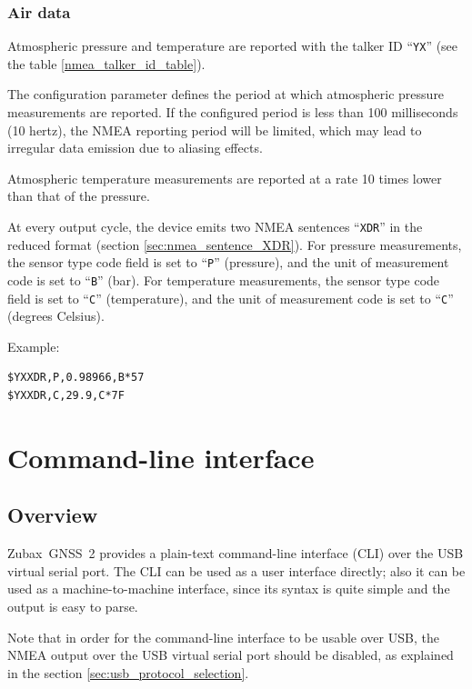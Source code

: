 \documentclass{zubaxdoc}
\begin{document}
\subsection{Air data}

Atmospheric pressure and temperature are reported with the talker ID ``\verb|YX|''
(see the table \ref{nmea_talker_id_table}).

The configuration parameter  defines the period at which atmospheric pressure measurements
are reported.
If the configured period is less than 100 milliseconds (10 hertz),
the NMEA reporting period will be limited,
which may lead to irregular data emission due to aliasing effects.

Atmospheric temperature measurements are reported at a rate 10 times lower than that of the pressure.

At every output cycle, the device emits two NMEA sentences ``\verb|XDR|'' in the reduced format
(section \ref{sec:nmea_sentence_XDR}).
For pressure measurements, the sensor type code field is set to ``\verb|P|'' (pressure),
and the unit of measurement code is set to ``\verb|B|'' (bar).
For temperature measurements, the sensor type code field is set to ``\verb|C|'' (temperature),
and the unit of measurement code is set to ``\verb|C|'' (degrees Celsius).

Example:
\begin{verbatim}
$YXXDR,P,0.98966,B*57
$YXXDR,C,29.9,C*7F
\end{verbatim}

%
%

\chapter{Command-line interface}\label{command-line_interface}

\section{Overview}

Zubax~GNSS~2 provides a plain-text command-line interface (CLI) over the USB virtual serial port.
The CLI can be used as a user interface directly;
also it can be used as a machine-to-machine interface,
since its syntax is quite simple and the output is easy to parse.

Note that in order for the command-line interface to be usable over USB,
the NMEA output over the USB virtual serial port should be disabled, as explained in
the section \ref{sec:usb_protocol_selection}.
\end{document}
